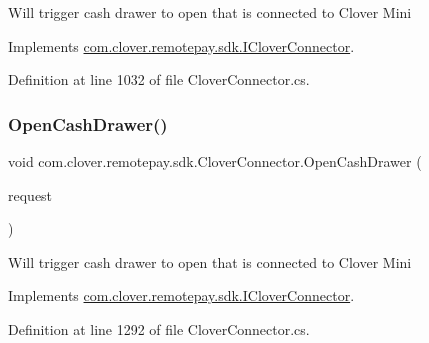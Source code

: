 Will trigger cash drawer to open that is connected to Clover Mini 



Implements \hyperlink{interfacecom_1_1clover_1_1remotepay_1_1sdk_1_1_i_clover_connector_a0fc361c449dc63eab061ca6866124deb}{com.\+clover.\+remotepay.\+sdk.\+I\+Clover\+Connector}.



Definition at line 1032 of file Clover\+Connector.\+cs.

\mbox{\label{classcom_1_1clover_1_1remotepay_1_1sdk_1_1_clover_connector_afe1e4de054f3bd0949e3d75730fc168f}} 
\subsubsection{\texorpdfstring{Open\+Cash\+Drawer()}{OpenCashDrawer()}\hspace{0.1cm}{\footnotesize\ttfamily [2/2]}}
{\footnotesize\ttfamily void com.\+clover.\+remotepay.\+sdk.\+Clover\+Connector.\+Open\+Cash\+Drawer (\begin{DoxyParamCaption}\item[{\hyperlink{classcom_1_1clover_1_1remotepay_1_1sdk_1_1_open_cash_drawer_request}{Open\+Cash\+Drawer\+Request}}]{request }\end{DoxyParamCaption})}



Will trigger cash drawer to open that is connected to Clover Mini 



Implements \hyperlink{interfacecom_1_1clover_1_1remotepay_1_1sdk_1_1_i_clover_connector_a9e5e3aeeb855129b4c176c13c7c632c0}{com.\+clover.\+remotepay.\+sdk.\+I\+Clover\+Connector}.



Definition at line 1292 of file Clover\+Connector.\+cs.

\mbox{\label{classcom_1_1clover_1_1remotepay_1_1sdk_1_1_clover_connector_ab770dbea796bfc3ffa1d0ed999d04b48}} 

